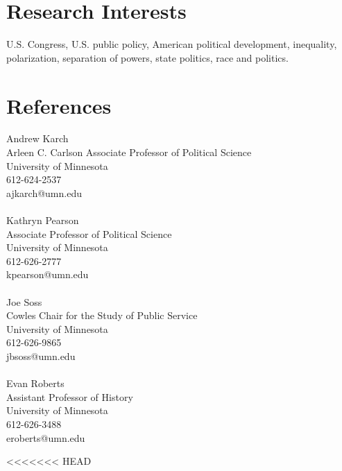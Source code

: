 \documentclass[12pt, letter]{article}
\begin{document}
\section*{Research Interests}
U.S. Congress, U.S. public policy, American political development, inequality, polarization, separation of powers, state politics, race and politics.

\section*{References}
\begin{multicols}{2}
	Andrew Karch \\
	Arleen C. Carlson Associate Professor of Political Science \\
	University of Minnesota \\
	612-624-2537 \\
	ajkarch@umn.edu \\
	\\
	Kathryn Pearson \\
	Associate Professor of Political Science \\
	University of Minnesota \\
	612-626-2777 \\
	kpearson@umn.edu\\
	\\
	Joe Soss \\
	Cowles Chair for the Study of Public Service \\
	University of Minnesota \\
	612-626-9865 \\
	jbsoss@umn.edu \\
	\\
	Evan Roberts \\
	Assistant Professor of History \\
	University of Minnesota \\
	612-626-3488 \\
	eroberts@umn.edu
\end{multicols}

<<<<<<< HEAD
\end{document}

